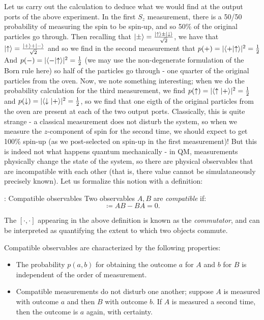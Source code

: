 Let us carry out the calculation to deduce what we would find at the output ports of the above experiment. In the first $S_z$ measurement, there is a 50/50 probability of measuring the spin to be spin-up, and so 50\% of the original particles go through. Then recalling that $\lvert \pm \rangle = \frac{\lvert \uparrow \rangle \pm \lvert \downarrow \rangle}{\sqrt{2}}$, we have that $\lvert \uparrow \rangle = \frac{\lvert + \rangle + \lvert - \rangle}{\sqrt{2}}$ and so we find in the second measurement that $p(+) = \lvert \langle + \lvert \uparrow \rangle \rvert^2 = \frac{1}{2}$ And $p(-) = \lvert \langle - \lvert \uparrow \rangle \rvert^2 = \frac{1}{2}$ (we may use the non-degenerate formulation of the Born rule here) so half of the particles go through - one quarter of the original particles from the oven. Now, we note something interesting; when we do the probability calculation for the third measurement, we find $p(\uparrow) = \lvert \langle \uparrow \lvert + \rangle \rvert^2 = \frac{1}{2}$ and $p(\downarrow) = \lvert \langle \downarrow \lvert + \rangle \rvert^2 = \frac{1}{2}$, so we find that one eigth of the original particles from the oven are present at each of the two output ports. Classically, this is quite strange - a classical measurement does not disturb the system, so when we measure the $z$-component of spin for the second time, we should expect to get 100\% spin-up (as we post-selected on spin-up in the first measurement)! But this is indeed not what happens quantum mechanically - in QM, measurements physically change the state of the system, so there are physical observables that are incompatible with each other (that is, there value cannot be simulataneously precisely known). Let us formalize this notion with a definition:

\begin{defbox}{: Compatible observables}
    Two observables $A, B$ are \emph{compatible} if:
    \begin{equation}
        [A, B] \coloneqq AB - BA = 0.
    \end{equation}
\end{defbox}

The $[\cdot, \cdot]$ appearing in the above definition is known as the \emph{commutator}, and can be interpreted as quantifying the extent to which two objects commute.

Compatible observables are characterized by the following properties:
\begin{itemize}
    \item The probability $p(a, b)$ for obtaining the outcome $a$ for $A$ and $b$ for $B$ is independent of the order of measurement.
    \item Compatible measurements do not disturb one another; suppose $A$ is measured with outcome $a$ and then $B$ with outcome $b$. If $A$ is measured a second time, then the outcome is $a$ again, with certainty.
\end{itemize}

